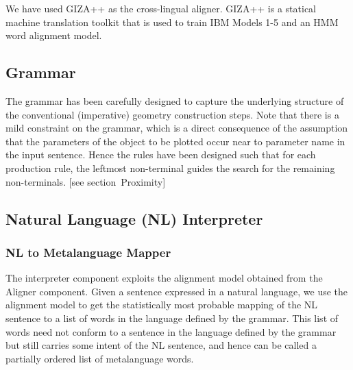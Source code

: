 \def\DevnagVersion{2.15}\documentclass[12pt]{article}
\begin{document}
We have used GIZA++ \cite{och2003systematic} as the cross-lingual aligner. GIZA++ is a statical machine translation toolkit that is used to train IBM Models 1-5 and an HMM word alignment model.\\

\subsection{Grammar}
The grammar has been carefully designed to capture the underlying structure of the conventional (imperative) geometry construction steps. Note that there is a mild constraint on the grammar, which is a direct consequence of the assumption that the parameters of the object to be plotted occur near to parameter name in the input sentence. Hence the rules have been designed such that for each production rule, the leftmost non-terminal guides the search for the remaining non-terminals. [see section~Proximity]

\subsection{Natural Language (NL) Interpreter}

\subsubsection{NL to Metalanguage Mapper}
The interpreter component exploits the alignment model obtained from the Aligner component. Given a sentence expressed in a natural language, we use the alignment model to get the statistically most probable mapping of the NL sentence to a list of words in the language defined by the grammar. This list of words need not conform to a sentence in the language defined by the grammar but still carries some intent of the NL sentence, and hence can be called a partially ordered list of metalanguage words.\\
\end{document}

